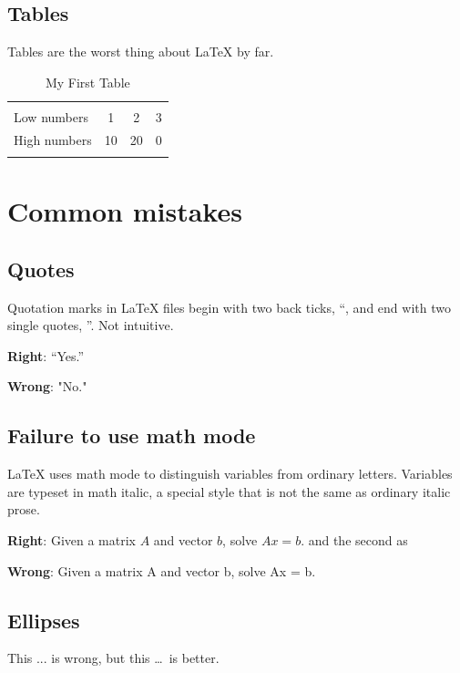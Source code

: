 \documentclass[11pt]{article} %
\begin{document}
\subsection{Tables}

Tables are the worst thing about \LaTeX{}  by far. 

\begin{table}[h]
\centering
\caption{My First Table}
\begin{tabular}{l c c c}
\\
\hline
\\
Low numbers & 1 & 2 & 3 \\
High numbers & 10 & 20 & 0 \\
\\
\hline
\end{tabular}
\end{table}

\section{Common mistakes}

\subsection*{Quotes}

Quotation marks in \LaTeX{}  files begin with two back ticks, ``, and end with two single quotes, ''. Not intuitive. 

{\bf Right}: ``Yes.''

{\bf Wrong}: "No."


\subsection*{Failure to use math mode} 

\LaTeX{} uses math mode to distinguish variables from ordinary letters. Variables are typeset in math italic, a special style that is not the same as ordinary italic prose.


{\bf Right}: Given a matrix $A$ and vector $b$, solve $Ax = b$.
and the second as

{\bf Wrong}: Given a matrix A and vector b, solve Ax = b.

\subsection*{Ellipses} 

This ... is wrong, but this \dots\ is better.
\end{document}
